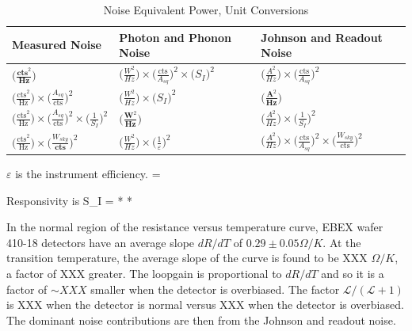\begin{longtable}{| l | l | l |}
\caption{Noise Equivalent Power, Unit Conversions} \label{NEP_table} \\
  \hline
  Measured Noise & Photon and Phonon Noise & Johnson and Readout Noise \\ \hline
  $\big( \frac{\textbf{cts}^2}{\textbf{Hz}} \big)$ & $\big( \frac{W^2}{Hz} \big) \times \big( \frac{\text{cts}}{A_{sq}} \big) ^2 \times \big( S_I \big) ^2$ & $\big( \frac{A^2}{Hz} \big) \times \big( \frac{\text{cts}}{A_{sq}} \big) ^2 $ \\ \hline
  $\big( \frac{\text{cts}^2}{\text{Hz}} \big) \times \big( \frac{A_{sq}}{\text{cts}} \big) ^2 $ & $\big( \frac{W^2}{Hz} \big) \times \big( S_I \big) ^2$ & $\big( \frac{\textbf{A}^2}{\textbf{Hz}} \big)$ \\ \hline
  $\big( \frac{\text{cts}^2}{\text{Hz}} \big) \times \big( \frac{A_{sq}}{\text{cts}} \big) ^2 \times \big( \frac{1}{S_I} \big) ^2$ & $\big( \frac{\textbf{W}^2}{\textbf{Hz}} \big)$ & $\big( \frac{A^2}{Hz} \big) \times \big( \frac{1}{S_I} \big) ^2$ \\ \hline
  $\big( \frac{\text{cts}^2}{\text{Hz}} \big) \times \big( \frac{W_{sky}}{\textbf{cts}} \big) ^2$ & $\big( \frac{W^2}{Hz} \big) \times \big( \frac{1}{\varepsilon} \big) ^2$ & $\big( \frac{A^2}{Hz} \big) \times \big( \frac{\text{cts}}{A_{sq}} \big) ^2 \times \big( \frac{W_{sky}}{\text{cts}} \big) ^2$ \\ \hline
\end{longtable}

$\varepsilon$ is the instrument efficiency.
\be
\varepsilon = 
\label{eq:eff_ratio}
\ee

Responsivity is
\be
S_I =  *  * 
\label{eq:current_responsivity}
\ee

In the normal region of the resistance versus temperature curve, \ac{EBEX} wafer 410-18 detectors have an average slope $dR/dT$ of $0.29\pm0.05 \Omega/K$. 
At the transition temperature, the average slope of the curve is found to be XXX $\Omega/K$, a factor of XXX greater. 
The loopgain is proportional to $dR/dT$ and so it is a factor of $\sim XXX$ smaller when the detector is overbiased. 
The factor $\mathcal{L}/(\mathcal{L}+1)$ is XXX when the detector is normal versus XXX when the detector is overbiased. 
The dominant noise contributions are then from the Johnson and readout noise. 

